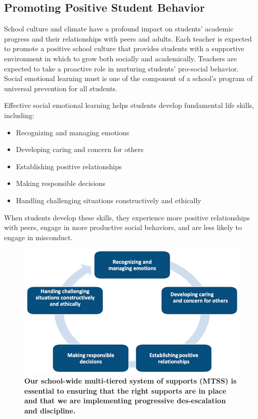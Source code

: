 \documentclass[11pt, letterpaper]{article}
\begin{document}
\subsection{Promoting Positive Student Behavior}
School culture and climate have a profound impact on students’ academic progress and their relationships with peers and adults. Each teacher is expected to promote a positive school culture that provides students with a supportive environment in which to grow both socially and academically. Teachers are expected to take a proactive role in nurturing students’ pro-social behavior. Social emotional learning must is one of the component of a school’s program of universal prevention for all students. 

Effective social emotional learning helps students develop fundamental life skills, including:
\begin{itemize}
\item Recognizing and managing emotions
\item Developing caring and concern for others
\item Establishing positive relationships
\item Making responsible decisions
\item Handling challenging situations constructively and ethically
\end{itemize}
When students develop these skills, they experience more positive relationships with peers, engage in more productive social behaviors, and are less likely to engage in misconduct.

\begin{figure}[H]
  \centering
  \includegraphics[width=.8\linewidth]{culture.png}
  \caption{\textbf{Our school-wide multi-tiered system of supports (MTSS) is essential to ensuring that the right supports are in place and that we are implementing progressive des-escalation and discipline.}}
  \label{fig:school culture}
\end{figure}
\end{document}
